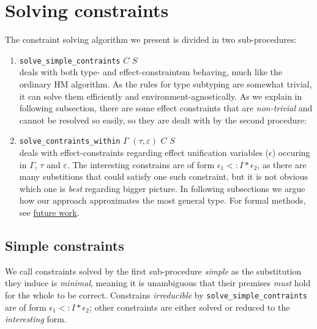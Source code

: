 \documentclass[declaration,shortabstract]{iithesis}
\begin{document}
\section{Solving constraints}
The constraint solving algorithm we present is divided in two sub-procedures:
\begin{enumerate}
    \item \texttt{solve\_simple\_contraints} $C$ $S$\\
    deals with both type- and effect-constraintsm behaving, much like the ordinary HM algorithm.
    As the rules for type subtyping are somewhat trivial, it can solve them efficiently and environment-agnostically. As we explain in following subsection, there are some effect constraints that are \textit{non-trivial} and cannot be resolved so easily, so they are dealt with by the second procedure:
    
    \item \texttt{solve\_contraints\_within} $\Gamma$ $(\tau, \varepsilon)$ $C$ $S$ \\
    deals with effect-constraints regarding effect unification variables ($\epsilon$) occuring in $\Gamma$, $\tau$ and $\varepsilon$.
    The interesting constrains are of form $\epsilon_1 <: I * \epsilon_2$,
    as there are many substitions that could satisfy one such constraint, but it is not obvious which one is \textit{best} regarding bigger picture.
    In following subsections we argue how our approach approximates the most general type.
    For formal methods, see \hyperlink{chapter.6}{future work}.
\end{enumerate}

\subsection{Simple constraints}
We call constraints solved by the first sub-procedure \textit{simple} as the substitution they induce is \textit{minimal}, meaning it is unambiguous that their premises \textit{must} hold for the whole to be correct. Constrains \textit{irreducible} by \texttt{solve\_simple\_contraints} are of form $\epsilon_1 <: I * \epsilon_2$; other constraints are either solved or reduced to the \textit{interesting} form.
\end{document}
